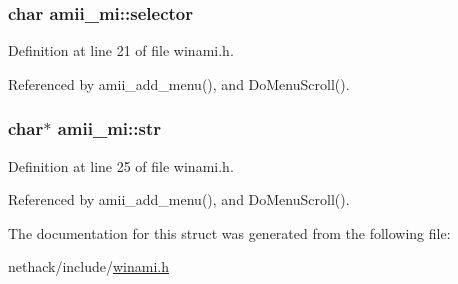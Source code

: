 \hypertarget{structamii__mi_a77084785d6d5815d0e006ad4ff6dd0b9}{
\subsubsection[{selector}]{\setlength{\rightskip}{0pt plus 5cm}char amii\+\_\+mi\+::selector}}\label{structamii__mi_a77084785d6d5815d0e006ad4ff6dd0b9}


Definition at line 21 of file winami.\+h.



Referenced by amii\+\_\+add\+\_\+menu(), and Do\+Menu\+Scroll().

\hypertarget{structamii__mi_a31791a6dba8c361ec8c8d5776bb82593}{
\subsubsection[{str}]{\setlength{\rightskip}{0pt plus 5cm}char$\ast$ amii\+\_\+mi\+::str}}\label{structamii__mi_a31791a6dba8c361ec8c8d5776bb82593}


Definition at line 25 of file winami.\+h.



Referenced by amii\+\_\+add\+\_\+menu(), and Do\+Menu\+Scroll().



The documentation for this struct was generated from the following file\+:\begin{DoxyCompactItemize}
\item 
nethack/include/\hyperlink{winami_8h}{winami.\+h}\end{DoxyCompactItemize}
